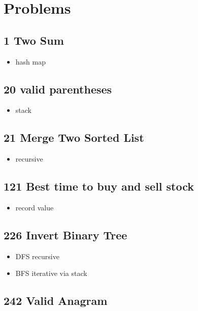 \section{Problems}

\subsection{ 1 Two Sum}

\begin{itemize}
	\item hash map
\end{itemize}

\subsection{20 valid parentheses}

\begin{itemize}
	\item  stack
\end{itemize}

\subsection{21 Merge Two Sorted List}

\begin{itemize}
	\item  recursive
\end{itemize}

\subsection{121 Best time to buy and sell stock}

\begin{itemize}
	\item record value
\end{itemize}

\subsection{226 Invert Binary Tree}

\begin{itemize}
	\item DFS recursive
	\item BFS iterative via stack
\end{itemize}

\subsection{242 Valid Anagram}

